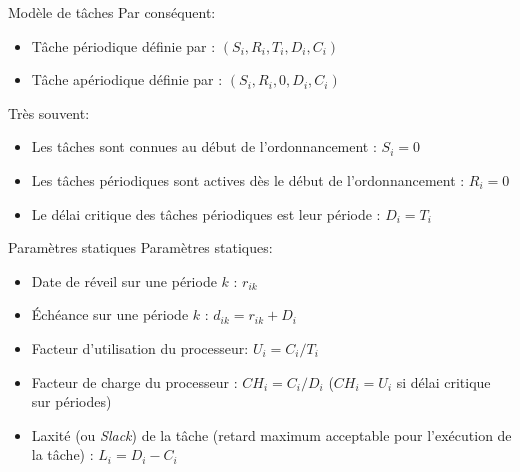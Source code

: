 \begin{frame}{Modèle de tâches}
  Par conséquent:
  \begin{itemize}
  \item Tâche périodique définie par : $(S_i, R_i, T_i ,D_i, C_i)$
  \item Tâche apériodique définie par : $(S_i, R_i, 0, D_i, C_i)$
  \end{itemize}
  Très souvent:
  \begin{itemize}
  \item Les tâches sont connues  au début de l'ordonnancement : $S_i =
    0$
    \item Les tâches périodiques sont actives dès le début de
      l'ordonnancement : $R_i = 0$
    \item Le délai critique des  tâches périodiques est leur période :
      $D_i = T_i$
  \end{itemize}
\end{frame}

\begin{frame}{Paramètres statiques}
  Paramètres statiques:
  \begin{itemize}
  \item Date de réveil sur une période $k$ : $r_{ik}$
  \item Échéance sur une période $k$ : $d_{ik} = r_{ik} + D_i$
  \item Facteur d'utilisation du processeur: $U_i =  C_i / T_i$
  \item Facteur de charge du processeur : $CH_i = C_i / D_i $ ($CH_i =
    U_i$ si délai critique sur périodes)
  \item  Laxité   (ou  \emph{Slack})  de  la   tâche  (retard  maximum
    acceptable pour l'exécution de la tâche) : $L_i = D_i - C_i$
  \end{itemize}
\end{frame}

